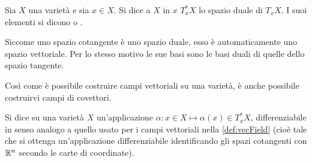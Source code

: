 \begin{definition}
  Sia $X$ una varietà e sia $x \in X$. Si dice  a $X$ in $x$ $T_x^* X$ lo spazio duale di $T_x X$. I suoi elementi si dicono  o .
\end{definition}
\begin{remark}
  Siccome uno spazio cotangente è uno spazio duale, esso è automaticamente uno spazio vettoriale. Per lo stesso motivo le sue basi sono le basi duali di quelle dello spazio tangente.
\end{remark}



Così come è possibile costruire campi vettoriali su una varietà, è anche possibile costruirvi campi di covettori.
\begin{definition} \label{def:1formCvc}
  Si dice  su una varietà $X$ un'applicazione $\alpha: x \in X \mapsto \alpha(x) \in T_x^* X$, differenziabile in senso analogo a quello usato per i campi vettoriali nella \autoref{def:vecField} (cioè tale che si ottenga un'applicazione differenziabile identificando gli spazi cotangenti con $\mathbb{R}^{n}$ secondo le carte di coordinate).
\end{definition}

